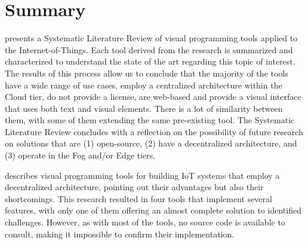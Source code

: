 \section{Summary}

 presents a Systematic Literature Review of visual programming tools applied to the Internet-of-Things. Each tool derived from the research is summarized and characterized to understand the state of the art regarding this topic of interest. The results of this process allow us to conclude that the majority of the tools have a wide range of use cases, employ a centralized architecture within the Cloud tier, do not provide a license, are web-based and provide a visual interface that uses both text and visual elements. There is a lot of similarity between them, with some of them extending the same pre-existing tool. The Systematic Literature Review concludes with a reflection on the possibility of future research on solutions that are (1) open-source, (2) have a decentralized architecture, and (3) operate in the Fog and/or Edge tiers.

 describes visual programming tools for building IoT systems that employ a decentralized architecture, pointing out their advantages but also their shortcomings. This research resulted in four tools that implement several features, with only one of them offering an almost complete solution to identified challenges. However, as with most of the tools, no source code is available to consult, making it impossible to confirm their implementation.


